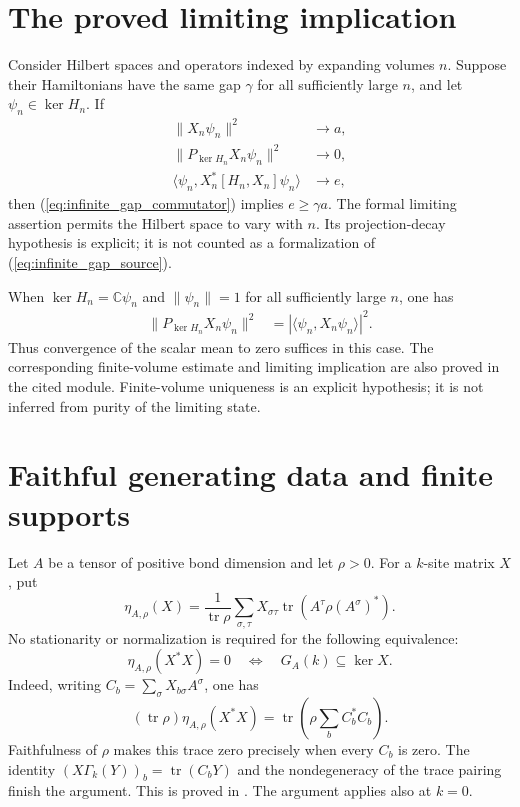 \documentclass{article}
\begin{document}
\section{The proved limiting implication}
Consider Hilbert spaces and operators indexed by expanding volumes $n$.
Suppose their Hamiltonians have the same gap $\gamma$ for all sufficiently
large $n$, and let $\psi_n\in\ker H_n$. If
\begin{align}
    \|X_n\psi_n\|^2&\longrightarrow a,
    \label{eq:infinite_gap_norm_limit}\\
    \|P_{\ker H_n}X_n\psi_n\|^2&\longrightarrow0,
    \label{eq:infinite_gap_projection_limit}\\
    \langle\psi_n,X_n^*[H_n,X_n]\psi_n\rangle&\longrightarrow e,
    \label{eq:infinite_gap_energy_limit}
\end{align}
then (\ref{eq:infinite_gap_commutator}) implies $e\geq\gamma a$.
The formal limiting assertion permits the Hilbert space to vary with $n$.
Its projection-decay hypothesis is explicit; it is not counted as a
formalization of (\ref{eq:infinite_gap_source}).

When $\ker H_n=\mathbb C\psi_n$ and $\|\psi_n\|=1$ for all sufficiently
large $n$, one has
\begin{align}
    \|P_{\ker H_n}X_n\psi_n\|^2
        &=|\langle\psi_n,X_n\psi_n\rangle|^2.
    \label{eq:infinite_gap_rank_one_projection}
\end{align}
Thus convergence of the scalar mean to zero suffices in this case.
The corresponding finite-volume estimate and limiting implication are
also proved in the cited module. Finite-volume uniqueness is an explicit
hypothesis; it is not inferred from purity of the limiting state.

\section{Faithful generating data and finite supports}

Let $A$ be a tensor of positive bond dimension and let $\rho>0$. For a
$k$-site matrix $X$, put
\[
 \eta_{A,\rho}(X)=\frac{1}{\operatorname{tr}\rho}
   \sum_{\sigma,\tau}X_{\sigma\tau}
       \operatorname{tr}(A^\tau\rho(A^\sigma)^*).
\]
No stationarity or normalization is required for the following equivalence:
\[
 \eta_{A,\rho}(X^*X)=0\quad\Longleftrightarrow\quad
 G_A(k)\subseteq\ker X.
\]
Indeed, writing $C_b=\sum_\sigma X_{b\sigma}A^\sigma$, one has
\[
 (\operatorname{tr}\rho)\eta_{A,\rho}(X^*X)
   =\operatorname{tr}\!\left(\rho\sum_b C_b^*C_b\right).
\]
Faithfulness of $\rho$ makes this trace zero precisely when every $C_b$ is
zero. The identity
$(X\Gamma_k(Y))_b=\operatorname{tr}(C_bY)$ and the nondegeneracy of the
trace pairing finish the argument. This is proved in
.
The argument applies also at $k=0$.
\end{document}
